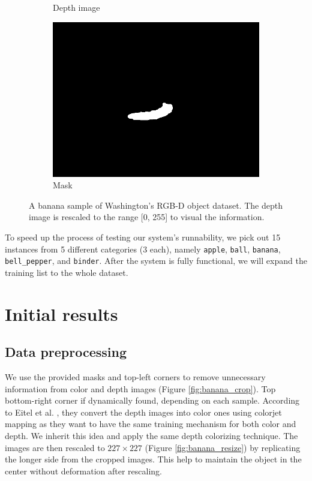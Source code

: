 \documentclass[paper=letter, fontsize=12pt]{article}
\begin{document}
\begin{figure}[htbp]
\begin{subfigure}[b]{0.32\linewidth}
		\caption{Depth image}
	\end{subfigure}
	\begin{subfigure}[b]{0.32\linewidth}
		\includegraphics[width=\textwidth]{banana_1_1_1_mask}
		\caption{Mask}
	\end{subfigure}

	\caption{A banana sample of Washington's RGB-D object dataset. The depth image is rescaled to the range [0, 255] to visual the information.}
	\label{fig:banana}
\end{figure}

To speed up the process of testing our system's runnability, we pick out 15 instances from 5 different categories (3 each), namely \texttt{apple}, \texttt{ball}, \texttt{banana}, \texttt{bell\_pepper}, and \texttt{binder}. After the system is fully functional, we will expand the training list to the whole dataset.


\section{Initial results}
\subsection{Data preprocessing} \label{sec:data_preprocessing}
We use the provided masks and top-left corners to remove unnecessary information from color and depth images (Figure \ref{fig:banana_crop}). Top bottom-right corner if dynamically found, depending on each sample. According to Eitel et al. \cite{Eitel2015}, they convert the depth images into color ones using colorjet mapping as they want to have the same training mechanism for both color and depth. We inherit this idea and apply the same depth colorizing technique. The images are then rescaled to $227 \times 227$ (Figure \ref{fig:banana_resize}) by replicating the longer side from the cropped images. This help to maintain the object in the center without deformation after rescaling.
\end{document}
